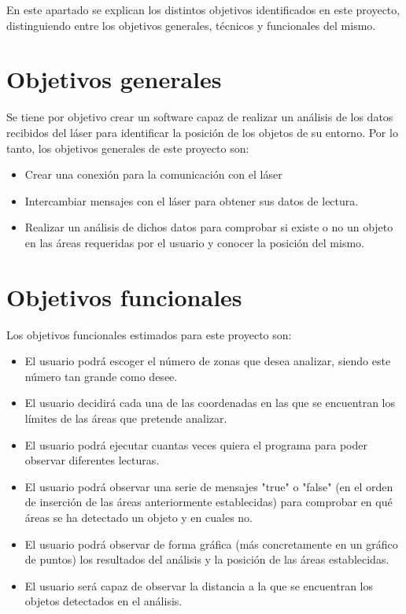 
En este apartado se explican los distintos objetivos identificados en este proyecto, distinguiendo entre los objetivos generales, técnicos y funcionales del mismo.\\

\section{Objetivos generales}

Se tiene por objetivo crear un software capaz de realizar un análisis de los datos recibidos del láser para identificar la posición de los objetos de su entorno. Por lo tanto, los objetivos generales de este proyecto son:
\begin{itemize}
	\item Crear una conexión para la comunicación con el láser
	\item Intercambiar mensajes con el láser para obtener sus datos de lectura.
    \item Realizar un análisis de dichos datos para comprobar si existe o no un objeto en las áreas requeridas por el usuario y conocer la posición del mismo.
\end{itemize} 

\section{Objetivos funcionales}
Los objetivos funcionales estimados para este proyecto son:
\begin{itemize}
	\item El usuario podrá escoger el número de zonas que desea analizar, siendo este número tan grande como desee.
	\item El usuario decidirá cada una de las coordenadas en las que se encuentran los límites de las áreas que pretende analizar.
	\item El usuario podrá ejecutar cuantas veces quiera el programa para poder observar diferentes lecturas.
	\item El usuario podrá observar una serie de mensajes "true" o "false" (en el orden de inserción de las áreas anteriormente establecidas) para comprobar en qué áreas se ha detectado un objeto y en cuales no.
	\item El usuario podrá observar de forma gráfica (más concretamente en un gráfico de puntos) los resultados del análisis y la posición de las áreas establecidas.
	\item El usuario será capaz de observar la distancia a la que se encuentran los objetos detectados en el análisis.
\end{itemize}

